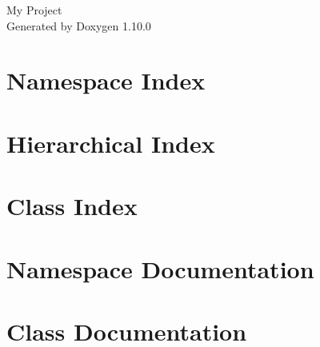 \documentclass[twoside]{book}
\newcommand{\+}{\discretionary{\mbox{\scriptsize$\hookleftarrow$}}{}{}}
\newcommand{\clearemptydoublepage}{%
    \newpage{\pagestyle{empty}\cleardoublepage}%
  }
\begin{document}
  \raggedbottom
    \hypersetup{pageanchor=false,
                bookmarksnumbered=true,
                pdfencoding=unicode
               }
  \begin{titlepage}
  \vspace*{7cm}
  \begin{center}%
  {\Large My Project}\\
  \vspace*{1cm}
  {\large Generated by Doxygen 1.10.0}\\
  \end{center}
  \end{titlepage}
  \clearemptydoublepage
  \tableofcontents
  \clearemptydoublepage
  \hypersetup{pageanchor=true}

\chapter{Namespace Index}

\chapter{Hierarchical Index}

\chapter{Class Index}

\chapter{Namespace Documentation}

\chapter{Class Documentation}









  \backmatter
  \newpage
  \clearemptydoublepage
  \printindex
\end{document}
